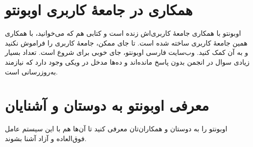 \section{همکاری در جامعهٔ کاربری اوبونتو}
اوبونتو با همکاری جامعهٔ کاربری‌اش زنده است و کتابی هم که می‌خوانید، با همکاری همین جامعهٔ کاربری ساخته شده است. تا جای ممکن، جامعهٔ کاربری را فراموش نکنید و به آن کمک کنید. وب‌سایت فارسی اوبونتو، جای خوبی برای شروع است. تعداد بسیار زیادی سوال در انجمن بدون پاسخ مانده‌اند و ده‌ها مدخل در ویکی وجود دارد که نیازمند به‌روزرسانی است.

\section{معرفی اوبونتو به دوستان و آشنایان}
اوبونتو را به دوستان و همکاران‌تان معرفی کنید تا آن‌ها هم با این سیستم عامل فوق‌العاده و آزاد آشنا بشوند.
